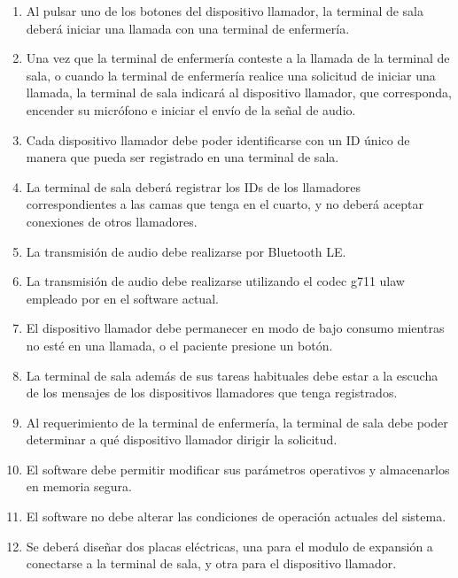 \begin{enumerate}

\item Al pulsar uno de los botones del dispositivo llamador, la terminal de sala deberá iniciar una llamada con una terminal de enfermería.

\item Una vez que la terminal de enfermería conteste a la llamada de la terminal de sala, o cuando la terminal de enfermería realice una solicitud de iniciar una llamada, la terminal de sala indicará al dispositivo llamador, que corresponda, encender su micrófono e iniciar el envío de la señal de audio.

\item Cada dispositivo llamador debe poder identificarse con un ID único de manera que pueda ser registrado en una terminal de sala.

\item La terminal de sala deberá registrar los IDs de los llamadores correspondientes a las camas que tenga en el cuarto, y no deberá aceptar conexiones de otros llamadores.

\item La transmisión de audio debe realizarse por Bluetooth LE.

\item La transmisión de audio debe realizarse utilizando el codec g711 ulaw empleado por en el software actual.

\item El dispositivo llamador debe permanecer en modo de bajo consumo mientras no esté en una llamada, o el paciente presione un botón.

\item La terminal de sala además de sus tareas habituales debe estar a la escucha de los mensajes de los dispositivos llamadores que tenga registrados.

\item Al requerimiento de la terminal de enfermería, la terminal de sala debe poder determinar a qué dispositivo llamador dirigir la solicitud.

\item El software debe permitir modificar sus parámetros operativos y almacenarlos en memoria segura.

\item El software no debe alterar las condiciones de operación actuales  del sistema.

\item Se deberá diseñar dos placas eléctricas, una para el modulo de expansión a conectarse a la terminal de sala, y otra para el dispositivo llamador.

\end{enumerate}

